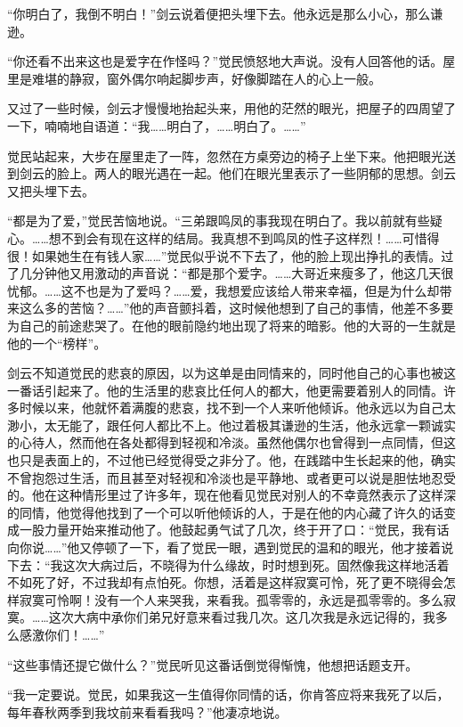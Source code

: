 \par “你明白了，我倒不明白！”剑云说着便把头埋下去。他永远是那么小心，那么谦逊。
\par “你还看不出来这也是爱字在作怪吗？”觉民愤怒地大声说。没有人回答他的话。屋里是难堪的静寂，窗外偶尔响起脚步声，好像脚踏在人的心上一般。
\par 又过了一些时候，剑云才慢慢地抬起头来，用他的茫然的眼光，把屋子的四周望了一下，喃喃地自语道：“我……明白了，……明白了。……”
\par 觉民站起来，大步在屋里走了一阵，忽然在方桌旁边的椅子上坐下来。他把眼光送到剑云的脸上。两人的眼光遇在一起。他们在眼光里表示了一些阴郁的思想。剑云又把头埋下去。
\par “都是为了爱，”觉民苦恼地说。“三弟跟鸣凤的事我现在明白了。我以前就有些疑心。……想不到会有现在这样的结局。我真想不到鸣凤的性子这样烈！……可惜得很！如果她生在有钱人家……”觉民似乎说不下去了，他的脸上现出挣扎的表情。过了几分钟他又用激动的声音说：“都是那个爱字。……大哥近来瘦多了，他这几天很忧郁。……这不也是为了爱吗？……爱，我想爱应该给人带来幸福，但是为什么却带来这么多的苦恼？……”他的声音颤抖着，这时候他想到了自己的事情，他差不多要为自己的前途悲哭了。在他的眼前隐约地出现了将来的暗影。他的大哥的一生就是他的一个“榜样”。
\par 剑云不知道觉民的悲哀的原因，以为这单是由同情来的，同时他自己的心事也被这一番话引起来了。他的生活里的悲哀比任何人的都大，他更需要着别人的同情。许多时候以来，他就怀着满腹的悲哀，找不到一个人来听他倾诉。他永远以为自己太渺小，太无能了，跟任何人都比不上。他过着极其谦逊的生活，他永远拿一颗诚实的心待人，然而他在各处都得到轻视和冷淡。虽然他偶尔也曾得到一点同情，但这也只是表面上的，不过他已经觉得受之非分了。他，在践踏中生长起来的他，确实不曾抱怨过生活，而且甚至对轻视和冷淡也是平静地、或者更可以说是胆怯地忍受的。他在这种情形里过了许多年，现在他看见觉民对别人的不幸竟然表示了这样深的同情，他觉得他找到了一个可以听他倾诉的人，于是在他的内心藏了许久的话变成一股力量开始来推动他了。他鼓起勇气试了几次，终于开了口：“觉民，我有话向你说……”他又停顿了一下，看了觉民一眼，遇到觉民的温和的眼光，他才接着说下去：“我这次大病过后，不晓得为什么缘故，时时想到死。固然像我这样地活着不如死了好，不过我却有点怕死。你想，活着是这样寂寞可怜，死了更不晓得会怎样寂寞可怜啊！没有一个人来哭我，来看我。孤零零的，永远是孤零零的。多么寂寞。……这次大病中承你们弟兄好意来看过我几次。这几次我是永远记得的，我多么感激你们！……”
\par “这些事情还提它做什么？”觉民听见这番话倒觉得惭愧，他想把话题支开。
\par “我一定要说。觉民，如果我这一生值得你同情的话，你肯答应将来我死了以后，每年春秋两季到我坟前来看看我吗？”他凄凉地说。

